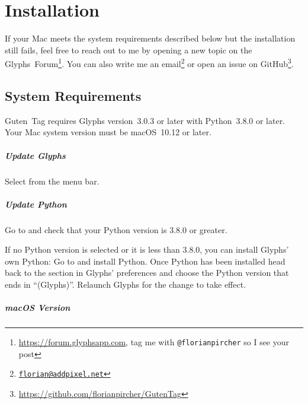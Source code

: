 \chapter{Installation}%
\label{cha:installation}

If your Mac meets the system requirements described below but the installation still fails, feel free to reach out to me by opening a new topic on the Glyphs~Forum\footnote{\url{https://forum.glyphsapp.com}, tag me with \texttt{@florianpircher} so I see your post}.
You can also write me an email\footnote{\texttt{\href{mailto:florian@addpixel.net}{florian@addpixel.net}}} or open an issue on GitHub\footnote{\url{https://github.com/florianpircher/GutenTag}}.

\section{System Requirements}%
\label{sec:system_requirements}

Guten~Tag requires Glyphs version~3.0.3 or later with Python~3.8.0 or later.
Your Mac system version must be macOS~10.12 or later.

\paragraph{Update Glyphs}%
\label{par:update_glyphs}

Select  from the menu bar.

\medbreak\noindent{}

\paragraph{Update Python}%
\label{par:update_python}

Go to  and check that your Python version is 3.8.0 or greater.

If no Python version is selected or it is less than 3.8.0, you can install Glyphs’ own Python:
Go to  and install Python.
Once Python has been installed head back to the  section in Glyphs’ preferences and choose the Python version that ends in \enquote{(Glyphs)}.
Relaunch Glyphs for the change to take effect.

\paragraph{macOS Version}%
\label{par:macos_version}

